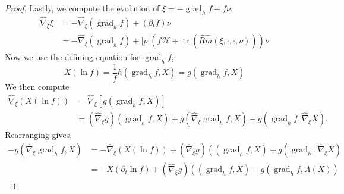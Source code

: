 \documentclass{amsart}
\theoremstyle{definition}
\theoremstyle{remark}
\numberwithin{equation}{section}
\begin{document}
\begin{proof}
Lastly, we compute the evolution of $\xi = -\operatorname{grad}_h f +  f \nu$.
\begin{equation}
\label{eq:dt_transverse_productrule}
\begin{split}
\hat{\nabla}_{\xi}\xi &= -\hat{\nabla}_{\xi} \left(\operatorname{grad}_h f\right) + (\partial_t f) \nu \\
&= -\hat{\nabla}_{\xi}\left(\operatorname{grad}_h f\right) + |p|(f\mathcal{H}+\operatorname{tr} (\widehat{Rm}(\xi,\cdot,\cdot,\nu))) \nu
\end{split}
\end{equation}
Now we use the defining equation for $\operatorname{grad}_h f$,
\[
X(\ln f) = \frac{1}{f} h(\operatorname{grad}_h f, X) = g(\operatorname{grad}_h f, X)
\]
We then compute
\[
\begin{split}
\hat{\nabla}_{\xi} \left(X(\ln f)\right) &= \hat{\nabla}_{\xi} \left[g(\operatorname{grad}_h f, X)\right] \\
&= (\hat{\nabla}_{\xi} g) (\operatorname{grad}_h f, X) + g(\hat{\nabla}_{\xi} \operatorname{grad}_h f, X) + g(\operatorname{grad}_h f,  \hat{\nabla}_{\xi} X).
\end{split}
\]
Rearranging gives,
\begin{equation}
\label{eq:dt_transversegradient_structure}
\begin{split}
-g(\hat{\nabla}_{\xi} \operatorname{grad}_h f, X) &= -\hat{\nabla}_{\xi} \left(X(\ln f)\right) + (\hat{\nabla}_{\xi} g) (\operatorname(\operatorname{grad}_h f, X) + g(\operatorname{grad}_h,  \hat{\nabla}_{\xi} X) \\
&= -X(\partial_t \ln f) + (\hat{\nabla}_{\xi} g) (\operatorname(\operatorname{grad}_h f, X) - g(\operatorname{grad}_h f,  A(X))
\end{split}
\end{equation}


\end{proof}
\end{document}

